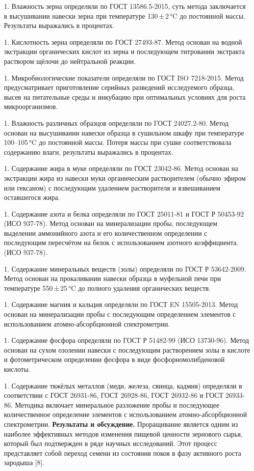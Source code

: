 1. Влажность зерна определяли по ГОСТ 13586.5-2015, суть метода
заключается в высушивании навески зерна при температуре 130\,±\,2\,°C
до постоянной массы. Результаты выражались в процентах.

1. Кислотность зерна определяли по ГОСТ 27493-87. Метод основан на водной
экстракции органических кислот из зерна и последующем титровании
экстракта раствором щёлочи до нейтральной реакции.

1. Микробиологические показатели определяли по ГОСТ ISO 7218-2015. Метод
предусматривает приготовление серийных разведений исследуемого
образца, высев на питательные среды и инкубацию при оптимальных
условиях для роста микроорганизмов.

1. Влажность различных образцов определяли по ГОСТ 24027.2-80. Метод
основан на высушивании навески образца в сушильном шкафу при
температуре 100--105\,°C до постоянной массы. Потеря массы при сушке
соответствовала содержанию влаги, результаты выражались в процентах.

1. Содержание жира в муке определяли по ГОСТ 23042-86. Метод основан на
экстракции жира из навески муки органическим растворителем (обычно
эфиром или гексаном) с последующим удалением растворителя и
взвешиванием оставшегося жира.

1. Содержание азота и белка определяли по ГОСТ 25011-81 и ГОСТ Р 50453-92
(ИСО 937-78). Метод основан на минерализации пробы, последующем
выделении аммонийного азота и его количественном определении с
последующим пересчётом на белок с использованием азотного
коэффициента. (ИСО 937-78).

1. Содержание минеральных веществ (золы) определяли по ГОСТ Р
53642-2009. Метод основан на прокаливании навески образца в муфельной
печи при температуре 550\,±\,25\,°C до полного удаления органических
веществ.

1. Содержание магния и кальция определяли по ГОСТ EN 15505-2013. Метод
основан на минерализации пробы с последующим определением элементов с
использованием атомно-абсорбционной спектрометрии.

1. Содержание фосфора определяли по ГОСТ Р 51482-99 (ИСО 13730-96). Метод
основан на сухом озолении навески с последующим растворением золы в
кислоте и фотометрическом определении фосфора в виде
фосфорномолибденовой кислоты.

1. Содержание тяжёлых металлов (меди, железа, свинца, кадмия) определяли
в соответствии с ГОСТ 26931-86, ГОСТ 26928-86, ГОСТ 26932-86 и ГОСТ
26933-86. Методика включает минеральное разложение пробы и последующее
количественное определение элементов с использованием
атомно-абсорбционной спектрометрии.
{\bfseries Результаты и обсуждение.} Проращивание является одним из
наиболее эффективных методов изменения пищевой ценности зернового сырья,
который был подтвержден в ряде научных исследований. Этот процесс
представляет собой переход семени из состояния покоя в фазу активного
роста зародыша {[}8{]}.

